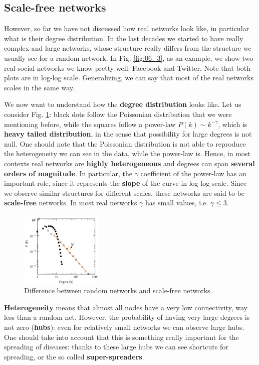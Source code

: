 \documentclass[../main/main.tex]{subfiles}
\begin{document}
\subsection{Scale-free networks}

However, so far we have not discussed how real networks look like, in particular what is their degree distribution. In the last decades we started to have really complex and large networks, whose structure really differs from the structure we usually see for a random network. In Fig. \ref{fig:06_3}, as an example, we show two real social networks we know pretty well: Facebook and Twitter. Note that both plots are in log-log scale. Generalizing, we can say that most of the real networks scales in the same way.

We now want to understand how the \textbf{degree distribution} looks like. Let us consider Fig. \ref{fig:06_4}: black dots follow the Poissonian distribution that we were mentioning before, while the squares follow a power-law \( P(k) \sim k^{- \gamma  } \), which is \textbf{heavy tailed distribution}, in the sense that possibility for large degrees is not null. One should note that the Poissonian distribution is not able to reproduce the heterogeneity we can see in the data, while the power-law is. Hence, in most contexts real networks are \textbf{highly heterogeneous} and degrees can span \textbf{several orders of magnitude}. In particular, the \( \gamma   \) coefficient of the power-law has an important role, since it represents the \textbf{slope} of the curve in log-log scale.
Since we observe similar structures for different scales, these networks are said to be \textbf{scale-free} networks. In most real networks $\gamma$ has small values, i.e. \( \gamma \le 3 \).


\begin{figure}[h!]
\centering
\includegraphics[width=0.35\textwidth]{../lessons/image/06/5.png}
\caption{\label{fig:06_4} Difference between random networks and scale-free networks.}
\end{figure}

\textbf{Heterogeneity} means that almost all nodes have a very low connectivity, way less than a random net. However, the probability of having very large degrees is not zero (\textbf{hubs}): even for relatively small networks we can observe large hubs. One should take into account that this is something really important for the spreading of diseases: thanks to these large hubs we can see shortcuts for spreading, or the so called \textbf{super-spreaders}.
\end{document}
